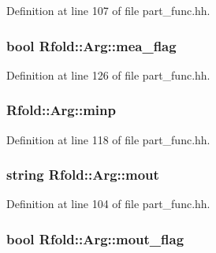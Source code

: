 Definition at line 107 of file part\+\_\+func.\+hh.

\hypertarget{class_rfold_1_1_arg_a7b3d1a355bec84586c9832c1858a2f6b}{
\subsubsection[{mea\+\_\+flag}]{\setlength{\rightskip}{0pt plus 5cm}bool Rfold\+::\+Arg\+::mea\+\_\+flag}}\label{class_rfold_1_1_arg_a7b3d1a355bec84586c9832c1858a2f6b}


Definition at line 126 of file part\+\_\+func.\+hh.

\hypertarget{class_rfold_1_1_arg_a4ea3681597506bb5d8b10e2cda9a3ca6}{
\subsubsection[{minp}]{ Rfold\+::\+Arg\+::minp}}\label{class_rfold_1_1_arg_a4ea3681597506bb5d8b10e2cda9a3ca6}


Definition at line 118 of file part\+\_\+func.\+hh.

\hypertarget{class_rfold_1_1_arg_ad397909fcb25763feae093230be4358b}{
\subsubsection[{mout}]{\setlength{\rightskip}{0pt plus 5cm}string Rfold\+::\+Arg\+::mout}}\label{class_rfold_1_1_arg_ad397909fcb25763feae093230be4358b}


Definition at line 104 of file part\+\_\+func.\+hh.

\hypertarget{class_rfold_1_1_arg_a1baaa9f8d531ed3c0688d4791855c543}{
\subsubsection[{mout\+\_\+flag}]{\setlength{\rightskip}{0pt plus 5cm}bool Rfold\+::\+Arg\+::mout\+\_\+flag}}\label{class_rfold_1_1_arg_a1baaa9f8d531ed3c0688d4791855c543}



